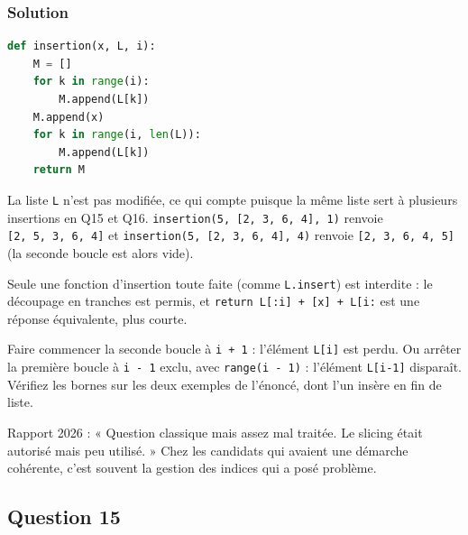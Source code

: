 \documentclass[11pt,a4paper]{article}
\begin{document}
\hypertarget{solution-13}{%
\subsubsection{Solution}\label{solution-13}}

\begin{lstlisting}[language=Python]
def insertion(x, L, i):
    M = []
    for k in range(i):
        M.append(L[k])
    M.append(x)
    for k in range(i, len(L)):
        M.append(L[k])
    return M
\end{lstlisting}

La liste \texttt{L} n'est pas modifiée, ce qui compte puisque la même liste sert à plusieurs insertions en Q15 et Q16. \texttt{insertion(\allowbreak{}5,\allowbreak{}\ {[}2,\allowbreak{}\ 3,\allowbreak{}\ 6,\allowbreak{}\ 4{]}\allowbreak{},\allowbreak{}\ 1)\allowbreak{}} renvoie \texttt{{[}2,\ 5,\ 3,\ 6,\ 4{]}} et \texttt{insertion(\allowbreak{}5,\allowbreak{}\ {[}2,\allowbreak{}\ 3,\allowbreak{}\ 6,\allowbreak{}\ 4{]}\allowbreak{},\allowbreak{}\ 4)\allowbreak{}} renvoie \texttt{{[}2,\ 3,\ 6,\ 4,\ 5{]}} (la seconde boucle est alors vide).

Seule une fonction d'insertion toute faite (comme \texttt{L.insert}) est interdite : le découpage en tranches est permis, et \texttt{return\ L{[}:\allowbreak{}i{]}\allowbreak{}\ +\ {[}x{]}\allowbreak{}\ +\ L{[}i:\allowbreak{}{]}\allowbreak{}} est une réponse équivalente, plus courte.

\begin{piege}

Faire commencer la seconde boucle à \texttt{i\ +\ 1} : l'élément \texttt{L{[}i{]}} est perdu. Ou arrêter la première boucle à \texttt{i\ -\ 1} exclu, avec \texttt{range(i\ -\ 1)} : l'élément \texttt{L{[}i-1{]}} disparaît. Vérifiez les bornes sur les deux exemples de l'énoncé, dont l'un insère en fin de liste.

\end{piege}

\begin{jury}

Rapport 2026 : « Question classique mais assez mal traitée. Le slicing était autorisé mais peu utilisé. » Chez les candidats qui avaient une démarche cohérente, c'est souvent la gestion des indices qui a posé problème.

\end{jury}

\hypertarget{question-15}{%
\subsection{Question 15}\label{question-15}}
\end{document}
